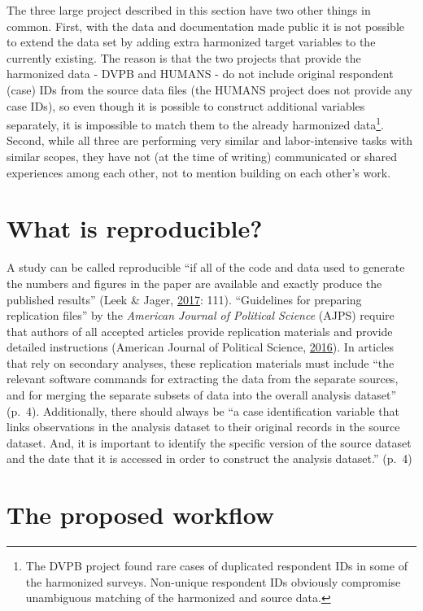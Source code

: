 \documentclass[12pt,]{article}
\let\rmarkdownfootnote\footnote%
\def\footnote{\protect\rmarkdownfootnote}
\begin{document}
The three large project described in this section have two other things in common. First, with the data and documentation made public it is not possible to extend the data set by adding extra harmonized target variables to the currently existing. The reason is that the two projects that provide the harmonized data - DVPB and HUMANS - do not include original respondent (case) IDs from the source data files (the HUMANS project does not provide any case IDs), so even though it is possible to construct additional variables separately, it is impossible to match them to the already harmonized data\footnote{The DVPB project found rare cases of duplicated respondent IDs in some of the harmonized surveys. Non-unique respondent IDs obviously compromise unambiguous matching of the harmonized and source data.}. Second, while all three are performing very similar and labor-intensive tasks with similar scopes, they have not (at the time of writing) communicated or shared experiences among each other, not to mention building on each other's work.

\hypertarget{what-is-reproducible}{%
\section{What is reproducible?}\label{what-is-reproducible}}

A study can be called reproducible ``if all of the code and data used to generate the numbers and figures in the paper are available and exactly produce the published results'' (Leek \& Jager, \protect\hyperlink{ref-Leek2017}{2017}: 111). ``Guidelines for preparing replication files'' by the \emph{American Journal of Political Science} (AJPS) require that authors of all accepted articles provide replication materials and provide detailed instructions (American Journal of Political Science, \protect\hyperlink{ref-AJPS2016}{2016}). In articles that rely on secondary analyses, these replication materials must include ``the relevant software commands for extracting the data from the separate sources, and for merging the separate subsets of data into the overall analysis dataset'' (p.~4). Additionally, there should always be ``a case identification variable that links observations in the analysis dataset to their original records in the source dataset. And, it is important to identify the specific version of the source dataset and the date that it is accessed in order to construct the analysis dataset.'' (p.~4)

\hypertarget{the-proposed-workflow}{%
\section{The proposed workflow}\label{the-proposed-workflow}}
\end{document}
